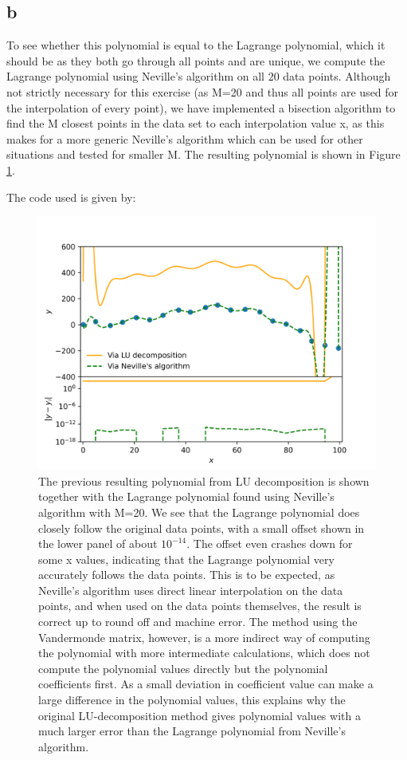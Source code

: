 \subsection{b}

To see whether this polynomial is equal to the Lagrange polynomial, which it should be as they both go through all points and are unique, we compute the Lagrange
polynomial using Neville's algorithm on all 20 data points. Although not strictly necessary for this exercise (as M=20 and thus all points are used for the interpolation of every point),
we have implemented a bisection algorithm to find the M closest points in the data set to each interpolation value x, as this makes for a more generic Neville's algorithm which can be used
for other situations and tested for smaller M. The resulting polynomial is shown in Figure \ref{fig:2b}.

The code used is given by:


\begin{figure}[h!]
    \centering
    \includegraphics[width=0.9\linewidth]{./my_vandermonde_sol_2b.png}
    \caption{The previous resulting polynomial from LU decomposition is shown together with the Lagrange polynomial found using Neville's algorithm with M=20. We see that the Lagrange polynomial does closely follow the original
    data points, with a small offset shown in the lower panel of about $10^{-14}$. The offset even crashes down for some x values, indicating that the Lagrange polynomial very accurately
    follows the data points. This is to be expected, as Neville's algorithm uses direct linear interpolation on the data points, and when used on the data points themselves, the result is correct up to round off and machine error.
    The method using the Vandermonde matrix, however, is a more indirect way of computing the polynomial with more intermediate calculations, which does not compute the polynomial values directly but the polynomial coefficients first.
    As a small deviation in coefficient value can make a large difference in the polynomial values, this explains why the original LU-decomposition method gives polynomial values with a much larger error than the Lagrange polynomial from Neville's algorithm.}
    \label{fig:2b}
\end{figure}


